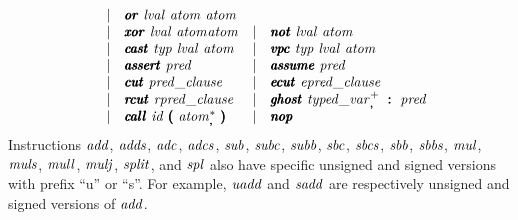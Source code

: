 \documentclass{article}
\begin{document}
\[\begin{array}{rclcl}
         & \mid & \pmb{\mathit{or}}\ \mathit{lval}\ \mathit{atom}\ \mathit{atom} \\
         & \mid & \pmb{\mathit{xor}}\ \mathit{lval}\ \mathit{atom} \mathit{atom}
         & \mid & \pmb{\mathit{not}}\ \mathit{lval}\ \mathit{atom} \\
         & \mid & \pmb{\mathit{cast}}\ \mathit{typ}\ \mathit{lval}\ \mathit{atom}
         & \mid & \pmb{\mathit{vpc}}\ \mathit{typ}\ \mathit{lval}\ \mathit{atom} \\
         & \mid & \pmb{\mathit{assert}}\ \mathit{pred}
         & \mid & \pmb{\mathit{assume}}\ \mathit{pred} \\
         & \mid & \pmb{\mathit{cut}}\ \mathit{pred\_clause}
         & \mid & \pmb{\mathit{ecut}}\ \mathit{epred\_clause} \\
         & \mid & \pmb{\mathit{rcut}}\ \mathit{rpred\_clause}
         & \mid & \pmb{\mathit{ghost}}\ \mathit{typed\_var}_{\pmb,}^+\ \pmb{:}\ \mathit{pred} \\
         & \mid & \pmb{\mathit{call}}\ \mathit{id}\ \pmb{(}\ \mathit{atom}_{\pmb,}^*\
           \pmb{)}
  & \mid & \pmb{\mathit{nop}}
\end{array}
\]
Instructions $\mathit{add}$, $\mathit{adds}$, $\mathit{adc}$, $\mathit{adcs}$, $\mathit{sub}$, $\mathit{subc}$,
$\mathit{subb}$, $\mathit{sbc}$, $\mathit{sbcs}$, $\mathit{sbb}$, $\mathit{sbbs}$, $\mathit{mul}$, $\mathit{muls}$,
$\mathit{mull}$, $\mathit{mulj}$, $\mathit{split}$, and $\mathit{spl}$ also have specific unsigned
and signed versions with prefix ``u'' or ``s''.
For example, $\mathit{uadd}$ and $\mathit{sadd}$ are respectively unsigned and
signed versions of $\mathit{add}$.
\end{document}
